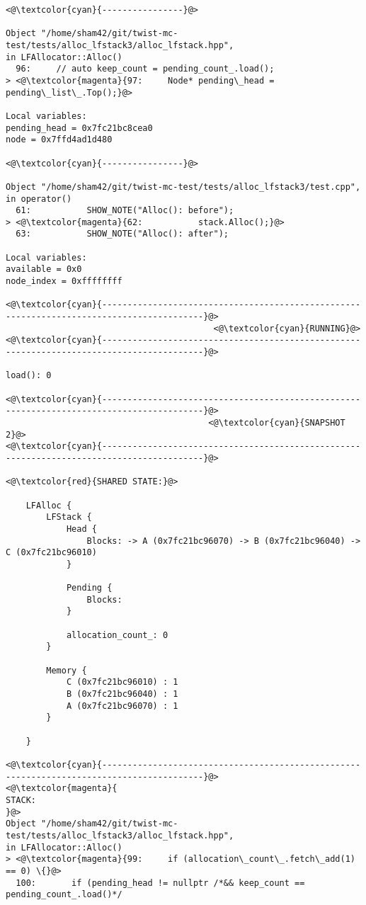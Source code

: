\begin{adjustwidth}{-3.3cm}{-1cm}
\begin{allintypewriter}
\begin{multicols*}{2}
\begin{lstlisting}[numbers=none]
<@\textcolor{cyan}{----------------}@>

Object "/home/sham42/git/twist-mc-test/tests/alloc_lfstack3/alloc_lfstack.hpp",
in LFAllocator::Alloc()
  96:     // auto keep_count = pending_count_.load();
> <@\textcolor{magenta}{97:     Node* pending\_head = pending\_list\_.Top();}@>

Local variables: 
pending_head = 0x7fc21bc8cea0
node = 0x7ffd4ad1d480

<@\textcolor{cyan}{----------------}@>

Object "/home/sham42/git/twist-mc-test/tests/alloc_lfstack3/test.cpp",
in operator()
  61:           SHOW_NOTE("Alloc(): before");
> <@\textcolor{magenta}{62:           stack.Alloc();}@>
  63:           SHOW_NOTE("Alloc(): after");

Local variables: 
available = 0x0
node_index = 0xffffffff

<@\textcolor{cyan}{------------------------------------------------------------------------------------------}@>
                                         <@\textcolor{cyan}{RUNNING}@>
<@\textcolor{cyan}{------------------------------------------------------------------------------------------}@>

load(): 0

<@\textcolor{cyan}{------------------------------------------------------------------------------------------}@>
                                        <@\textcolor{cyan}{SNAPSHOT 2}@>
<@\textcolor{cyan}{------------------------------------------------------------------------------------------}@>

<@\textcolor{red}{SHARED STATE:}@>

    LFAlloc {
	    LFStack {
		    Head {
			    Blocks: -> A (0x7fc21bc96070) -> B (0x7fc21bc96040) -> C (0x7fc21bc96010) 
		    }

		    Pending {
			    Blocks: 
		    }

		    allocation_count_: 0
	    }

	    Memory {
		    C (0x7fc21bc96010) : 1
		    B (0x7fc21bc96040) : 1
		    A (0x7fc21bc96070) : 1
	    }

    }

<@\textcolor{cyan}{------------------------------------------------------------------------------------------}@>
<@\textcolor{magenta}{
STACK:
}@>
Object "/home/sham42/git/twist-mc-test/tests/alloc_lfstack3/alloc_lfstack.hpp",
in LFAllocator::Alloc()
> <@\textcolor{magenta}{99:     if (allocation\_count\_.fetch\_add(1) == 0) \{}@>
  100:       if (pending_head != nullptr /*&& keep_count == pending_count_.load()*/


\end{lstlisting}
\end{multicols*}
\end{allintypewriter}
\end{adjustwidth}

